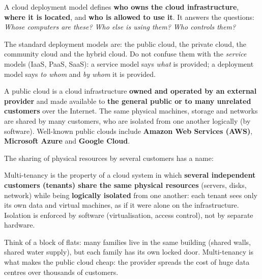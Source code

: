 \documentclass[11pt]{article}
\newcommand{\cle}[1]{{\popxbold\color{popdark}#1}}
\newcounter{popsec}
\newcounter{popsub}
\newcommand{\courssub}[1]{%
  \stepcounter{popsub}%
  \par\vspace{9pt}\noindent{\popxbold\fontsize{11.5}{13}\selectfont\color{popink}{\color{poporange}\thepopsec.\thepopsub}\hspace{6pt}#1}\par\nopagebreak\vspace{4pt}
}
\begin{document}
\begin{definition}
A \cle{cloud deployment model} defines \textbf{who owns the cloud infrastructure}, \textbf{where it is located}, and \textbf{who is allowed to use it}. It answers the questions: \emph{Whose computers are these? Who else is using them? Who controls them?}
\end{definition}

\begin{aretenir}
The standard deployment models are: the \cle{public cloud}, the \cle{private cloud}, the \cle{community cloud} and the \cle{hybrid cloud}. Do not confuse them with the \emph{service} models (IaaS, PaaS, SaaS): a service model says \emph{what} is provided; a deployment model says \emph{to whom} and \emph{by whom} it is provided.
\end{aretenir}

\courssub{The Public Cloud}

\begin{definition}
A \cle{public cloud} is a cloud infrastructure \textbf{owned and operated by an external provider} and made available to \textbf{the general public or to many unrelated customers} over the Internet. The same physical machines, storage and networks are shared by many customers, who are isolated from one another logically (by software). Well-known public clouds include \textbf{Amazon Web Services (AWS)}, \textbf{Microsoft Azure} and \textbf{Google Cloud}.
\end{definition}

The sharing of physical resources by several customers has a name:

\begin{definition}
\cle{Multi-tenancy} is the property of a cloud system in which \textbf{several independent customers (tenants) share the same physical resources} (servers, disks, network) while being \textbf{logically isolated} from one another: each tenant sees only its own data and virtual machines, as if it were alone on the infrastructure. Isolation is enforced by software (virtualisation, access control), not by separate hardware.
\end{definition}

Think of a block of flats: many families live in the same building (shared walls, shared water supply), but each family has its own locked door. Multi-tenancy is what makes the public cloud cheap: the provider spreads the cost of huge data centres over thousands of customers.
\end{document}
